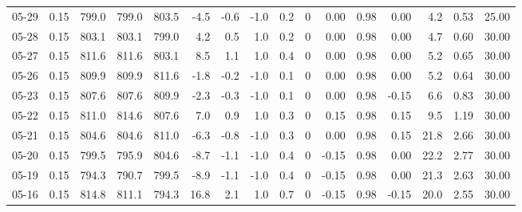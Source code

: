 \begin{threeparttable}
{\begin{tabular}{lrrrrrrrrrrrrrrr}
  05-29 &     0.15 & 799.0 & 799.0 & 803.5 &       -4.5 &           -0.6 &                     -1.0 &                 0.2 &              0 &       0.00 &      0.98 &           0.00 &              4.2 &            0.53 &                  25.00 \\
  05-28 &     0.15 & 803.1 & 803.1 & 799.0 &        4.2 &            0.5 &                      1.0 &                 0.2 &              0 &       0.00 &      0.98 &           0.00 &              4.7 &            0.60 &                  30.00 \\
  05-27 &     0.15 & 811.6 & 811.6 & 803.1 &        8.5 &            1.1 &                      1.0 &                 0.4 &              0 &       0.00 &      0.98 &           0.00 &              5.2 &            0.65 &                  30.00 \\
  05-26 &     0.15 & 809.9 & 809.9 & 811.6 &       -1.8 &           -0.2 &                     -1.0 &                 0.1 &              0 &       0.00 &      0.98 &           0.00 &              5.2 &            0.64 &                  30.00 \\
  05-23 &     0.15 & 807.6 & 807.6 & 809.9 &       -2.3 &           -0.3 &                     -1.0 &                 0.1 &              0 &       0.00 &      0.98 &          -0.15 &              6.6 &            0.83 &                  30.00 \\
  05-22 &     0.15 & 811.0 & 814.6 & 807.6 &        7.0 &            0.9 &                      1.0 &                 0.3 &              0 &       0.15 &      0.98 &           0.15 &              9.5 &            1.19 &                  30.00 \\
  05-21 &     0.15 & 804.6 & 804.6 & 811.0 &       -6.3 &           -0.8 &                     -1.0 &                 0.3 &              0 &       0.00 &      0.98 &           0.15 &             21.8 &            2.66 &                  30.00 \\
  05-20 &     0.15 & 799.5 & 795.9 & 804.6 &       -8.7 &           -1.1 &                     -1.0 &                 0.4 &              0 &      -0.15 &      0.98 &           0.00 &             22.2 &            2.77 &                  30.00 \\
  05-19 &     0.15 & 794.3 & 790.7 & 799.5 &       -8.9 &           -1.1 &                     -1.0 &                 0.4 &              0 &      -0.15 &      0.98 &           0.00 &             21.3 &            2.63 &                  30.00 \\
  05-16 &     0.15 & 814.8 & 811.1 & 794.3 &       16.8 &            2.1 &                      1.0 &                 0.7 &              0 &      -0.15 &      0.98 &          -0.15 &             20.0 &            2.55 &                  30.00 \\

\end{tabular}}
\end{threeparttable}
